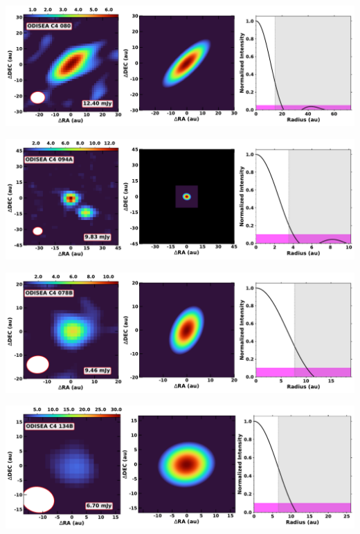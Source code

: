 \vspace{0pt}
\begin{minipage}{.49\textwidth}
	 \centering
	 	 \hrulesep
	 	 \includegraphics[width=1\linewidth]{pdf/0+I_F/008_odisea_c4_080_cutout.pdf}
\end{minipage}%
\vrulesep
\begin{minipage}{.49\textwidth}
	 \centering
	 	 \hrulesep
	 	 \includegraphics[width=1\linewidth]{pdf/0+I_F/006_odisea_c4_094a_cutout.pdf}
\end{minipage}%
\vspace{0pt}
\begin{minipage}{.49\textwidth}
	 \centering
	 	 \hrulesep
	 	 \includegraphics[width=1\linewidth]{pdf/0+I_F/005_odisea_c4_078b_cutout.pdf}
\end{minipage}%
\vrulesep
\begin{minipage}{.49\textwidth}
	 \centering
	 	 \hrulesep
	 	 \includegraphics[width=1\linewidth]{pdf/0+I_F/003_odisea_c4_134b_cutout.pdf}
\end{minipage}%
